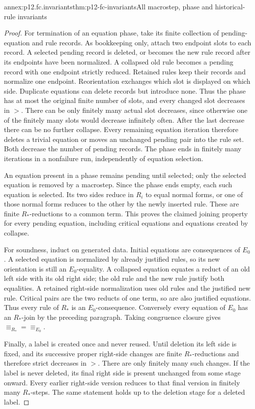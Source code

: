 \begin{annexitem}{annex:p12.fc.invariants}{thm:p12-fc-invariants}{All macrostep, phase and historical-rule invariants}
\begin{proof}
For termination of an equation phase, take its finite collection
of pending-equation and rule records. As bookkeeping only, attach
two endpoint slots to each record. A selected pending record is
deleted, or becomes the new rule record after its endpoints have
been normalized. A collapsed old rule becomes a pending record
with one endpoint strictly reduced. Retained rules keep their
records and normalize one endpoint. Reorientation exchanges which
slot is displayed on which side. Duplicate equations can delete
records but introduce none. Thus the phase has at most the original
finite number of slots, and every changed slot decreases in \(>\).
There can be only finitely many actual slot decreases, since otherwise
one of the finitely many slots would decrease infinitely often.
After the last decrease there can be no further collapse. Every
remaining equation iteration therefore deletes a trivial equation
or moves an unchanged pending pair into the rule set. Both decrease
the number of pending records. The phase ends in finitely many
iterations in a nonfailure run, independently of equation selection.

An equation present in a phase remains pending until selected;
only the selected equation is removed by a macrostep. Since the
phase ends empty, each such equation is selected. Its two sides
reduce in \(R_i\) to equal normal forms, or one of those normal
forms reduces to the other by the newly inserted rule. These are
finite \(R_*\)-reductions to a common term. This proves the
claimed joining property for every pending equation, including
critical equations and equations created by collapse.

For soundness, induct on generated data. Initial equations are
consequences of \(E_0\). A selected equation is normalized by
already justified rules, so its new orientation is still an
\(E_0\)-equality. A collapsed equation equates a reduct of an
old left side with its old right side; the old rule and the new
rule justify both equalities. A retained right-side normalization
uses old rules and the justified new rule. Critical pairs are
the two reducts of one term, so are also justified equations.
Thus every rule of \(R_*\) is an \(E_0\)-consequence.
Conversely every equation of \(E_0\) has an \(R_*\)-join by
the preceding paragraph. Taking congruence closure gives
\(\equiv_{R_*}=\equiv_{E_0}\).

Finally, a label is created once and never reused. Until deletion
its left side is fixed, and its successive proper right-side changes
are finite \(R_*\)-reductions and therefore strict decreases in
\(>\). There are only finitely many such changes. If the label
is never deleted, its final right side is present unchanged from
some stage onward. Every earlier right-side version reduces to
that final version in finitely many \(R_*\)-steps. The same
statement holds up to the deletion stage for a deleted label.
\end{proof}
\end{annexitem}


